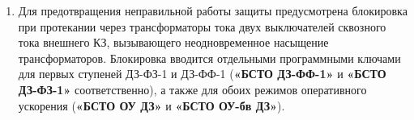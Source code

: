 \begin{enumerate}[label=\arabic{section}.\arabic{subsection}.\arabic{enumi}, labelsep=4pt, leftmargin=0pt, itemindent=57pt, itemsep=0pt, parsep=5pt]
\begin{enumerate}[label=\arabic{section}.\arabic{subsection}.\arabic{enumi}.\arabic*, labelsep=4pt, leftmargin=0em, itemindent=65pt, parsep=0pt]
\item
Для предотвращения неправильной работы защиты предусмотрена блокировка при протекании через трансформаторы тока двух выключателей сквозного тока внешнего КЗ, вызывающего неодновременное насыщение трансформаторов. Блокировка вводится отдельными программными ключами для первых ступеней ДЗ-ФЗ-1 и ДЗ-ФФ-1 (\textbf{«БСТО ДЗ-ФФ-1»} и \textbf{«БСТО ДЗ-ФЗ-1»} соответственно), а также для обоих режимов оперативного ускорения (\textbf{«БСТО ОУ ДЗ»} и \textbf{«БСТО ОУ-бв ДЗ»}).

\end{enumerate}


\end{enumerate}
